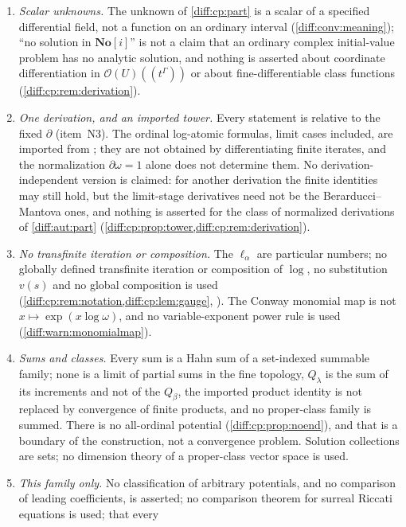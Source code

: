 \documentclass[11pt,letterpaper]{article}
\numberwithin{equation}{section}
\theoremstyle{definition}
\theoremstyle{remark}
\newcommand{\SC}{\mathbf{No}[i]}
\newcommand{\der}{\partial}
\newcommand{\Hol}{\mathscr O}
\begin{document}
\begin{enumerate}[label=\textup{N\arabic*.},leftmargin=3.0em,itemsep=0.35em,start=95]
\item \emph{Scalar unknowns.} The unknown of \cref{diff:cp:part} is a scalar of a
specified differential field, not a function on an ordinary interval
(\cref{diff:conv:meaning}); ``no solution in $\SC$'' is not a claim that an
ordinary complex initial-value problem has no analytic solution, and nothing
is asserted about coordinate differentiation in $\Hol(U)((t^{\Gamma}))$ or about
fine-differentiable class functions (\cref{diff:cp:rem:derivation}).
\item \emph{One derivation, and an imported tower.} Every statement is relative
to the fixed $\der$ (item~N3). The ordinal log-atomic formulas, limit cases
included, are imported from \cite[Section~2]{ADH}; they are not obtained by
differentiating finite iterates, and the normalization $\der\omega=1$ alone
does not determine them. No derivation-independent version is claimed: for
another derivation the finite identities may still hold, but the limit-stage
derivatives need not be the Berarducci--Mantova ones, and nothing is asserted
for the class of normalized derivations of \cref{diff:aut:part}
(\cref{diff:cp:prop:tower,diff:cp:rem:derivation}).
\item \emph{No transfinite iteration or composition.} The $\ell_{\alpha}$ are
particular numbers; no globally defined transfinite iteration or composition of
$\log$, no substitution $v(s)$ and no global composition is used
(\cref{diff:cp:rem:notation,diff:cp:lem:gauge}, \cite[Theorem~8.4]{BMGerms}).
The Conway monomial map is not $x\mapsto\exp(x\log\omega)$, and no
variable-exponent power rule is used (\cref{diff:warn:monomialmap}).
\item \emph{Sums and classes.} Every sum is a Hahn sum of a set-indexed summable
family; none is a limit of partial sums in the fine topology, $Q_{\lambda}$ is
the sum of its increments and not of the $Q_{\beta}$, the imported product
identity is not replaced by convergence of finite products, and no proper-class
family is summed. There is no all-ordinal potential
(\cref{diff:cp:prop:noend}), and that is a boundary of the construction, not a
convergence problem. Solution collections are sets; no dimension theory of a
proper-class vector space is used.
\item \emph{This family only.} No classification of arbitrary potentials, and
no comparison of leading coefficients, is asserted; no comparison theorem for
surreal Riccati equations is used; that every

\end{enumerate}
\end{document}
